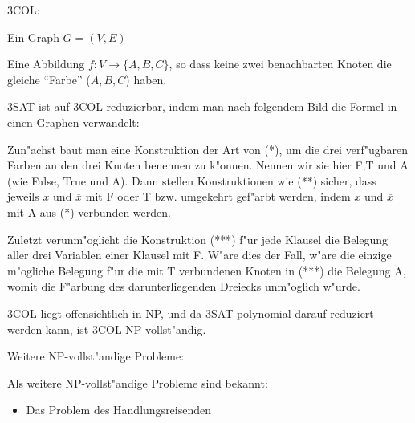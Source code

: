 \problem 3COL:{
  \given Ein Graph $G=(V,E)$
  
  \aim Eine Abbildung $f:V\to\{A,B,C\}$, so dass keine zwei benachbarten
    Knoten die gleiche ``Farbe'' ($A,B,C$) haben.
    
  3SAT ist auf 3COL reduzierbar, indem man nach folgendem Bild die Formel
  in einen Graphen verwandelt:

  
  
  Zun"achst baut man eine Konstruktion der Art von (*), um die drei 
  verf"ugbaren Farben an den drei Knoten benennen zu k"onnen. Nennen wir sie
  hier F,T und A (wie False, True und A). Dann stellen Konstruktionen wie (**)
  sicher, dass jeweils $x$ und $\overline x$ mit F oder T bzw. umgekehrt
  gef"arbt werden, indem $x$ und $\overline x$ mit A aus (*) verbunden werden.
  
  Zuletzt verunm"oglicht die Konstruktion (***) f"ur jede Klausel die Belegung 
  aller drei Variablen einer Klausel mit F. W"are dies der Fall, w"are die 
  einzige m"ogliche Belegung f"ur die mit T verbundenen Knoten in (***) die 
  Belegung A, womit die F"arbung des darunterliegenden Dreiecks unm"oglich 
  w"urde.
  
  3COL liegt offensichtlich in NP, und da 3SAT polynomial darauf reduziert 
  werden kann, ist 3COL NP-vollst"andig.
}
\example Weitere NP-vollst"andige Probleme:{
  Als weitere NP-vollst"andige Probleme sind bekannt:
  \begin{itemize}
    \item Das Problem des Handlungsreisenden
  \end{itemize}
}
